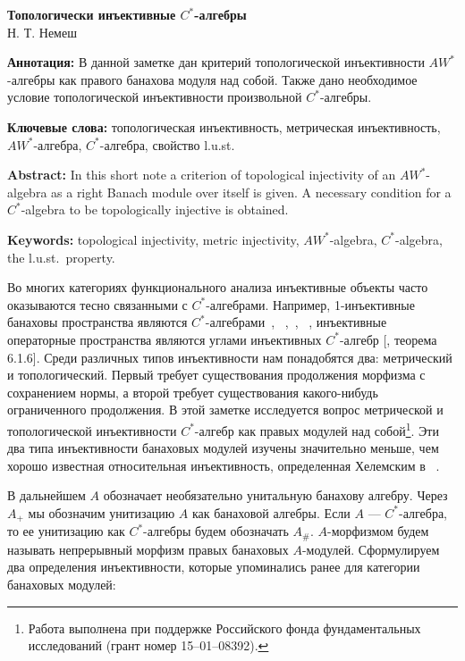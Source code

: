 \documentclass[12pt]{article}
\begin{document}
\begin{center}

\Large \textbf{Топологически инъективные $C^*$-алгебры}\\[0.5cm]
\small {Н. Т. Немеш}\\[0.5cm]

\end{center}
\thispagestyle{empty}

\textbf{Аннотация:} В данной заметке дан критерий топологической инъективности
$AW^*$-алгебры как правого банахова модуля над собой. Также дано необходимое
условие топологической инъективности произвольной $C^*$-алгебры. 

\medskip
\textbf{Ключевые слова:} топологическая инъективность, метрическая
инъективность, $AW^*$-алгебра, $C^*$-алгебра, свойство l.u.st.

\medskip
\textbf{Abstract:} In this short note a criterion of topological injectivity of
an $AW^*$-algebra as a right Banach module over itself is given. A necessary
condition for a $C^*$-algebra to be topologically injective is obtained.

\medskip
\textbf{Keywords:} topological injectivity, metric injectivity, $AW^*$-algebra,
$C^*$-algebra, the l.u.st.\ property.

\bigskip

Во многих категориях функционального анализа инъективные объекты часто
оказываются тесно связанными с $C^*$-алгебрами. Например, 1-инъективные банаховы
пространства являются $C^*$-алгебрами~\cite{NachThOfHahnBanachType},
~\cite{GooProjInNorLinSp},~\cite{KellBanSpWithExtProp},
~\cite{HasumiExtPropComplBanSp}, инъективные операторные пространства являются
углами инъективных $C^*$-алгебр [\cite{RuanOpSp}, теорема 6.1.6]. Среди
различных типов инъективности нам понадобятся два: метрический и топологический.
Первый требует существования продолжения морфизма с сохранением нормы, а второй
требует существования какого-нибудь ограниченного продолжения. В этой заметке
исследуется вопрос метрической и топологической инъективности $C^*$-алгебр как
правых модулей над собой\footnote{Работа выполнена при поддержке Российского
фонда фундаментальных исследований (грант номер 15--01--08392).}. Эти два типа
инъективности банаховых модулей изучены значительно меньше, чем хорошо известная
относительная инъективность, определенная Хелемским в
~\cite{HelemSheinbergFlatBanModAndAmenBanAlg}.

В дальнейшем $A$ обозначает необязательно унитальную банахову алгебру. Через
$A_+$ мы обозначим унитизацию $A$ как банаховой алгебры. Если $A$ ---
$C^*$-алгебра, то ее унитизацию как $C^*$-алгебры будем обозначать $A_\#$.
$A$-морфизмом будем называть непрерывный морфизм правых банаховых $A$-модулей.
Сформулируем два определения инъективности, которые упоминались ранее для
категории банаховых модулей:
\end{document}
